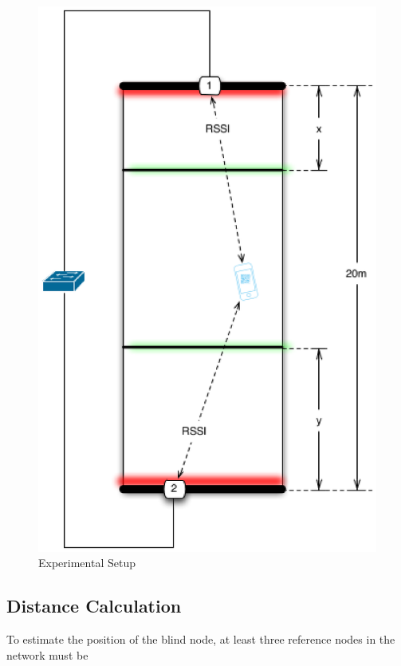 \documentclass[conference,a4paper]{../../sty/IEEEtran}
\begin{document}
\begin{figure}[h!]
\centering
\includegraphics[scale=0.5]{position.eps}
\caption{Experimental Setup}
\label{fig1}
\end{figure}

\subsection{Distance Calculation}

To estimate the position of the blind node, at least three reference nodes in the network must be
\end{document}
